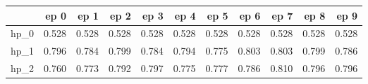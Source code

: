 \begin{tabular}{lrrrrrrrrrr}
\toprule
{} &   ep 0 &   ep 1 &   ep 2 &   ep 3 &   ep 4 &   ep 5 &   ep 6 &   ep 7 &   ep 8 &   ep 9 \\
\midrule
hp\_0 &  0.528 &  0.528 &  0.528 &  0.528 &  0.528 &  0.528 &  0.528 &  0.528 &  0.528 &  0.528 \\
hp\_1 &  0.796 &  0.784 &  0.799 &  0.784 &  0.794 &  0.775 &  0.803 &  0.803 &  0.799 &  0.786 \\
hp\_2 &  0.760 &  0.773 &  0.792 &  0.797 &  0.775 &  0.777 &  0.786 &  0.810 &  0.796 &  0.796 \\
\bottomrule
\end{tabular}
